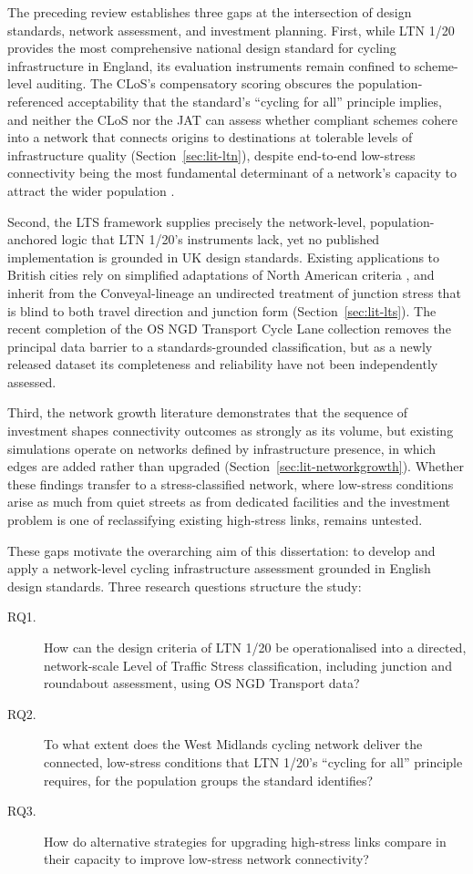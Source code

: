 The preceding review establishes three gaps at the intersection of design standards, network assessment, and investment planning. First, while LTN 1/20 provides the most comprehensive national design standard for cycling infrastructure in England, its evaluation instruments remain confined to scheme-level auditing. The CLoS's compensatory scoring obscures the population-referenced acceptability that the standard's ``cycling for all'' principle implies, and neither the CLoS nor the JAT can assess whether compliant schemes cohere into a network that connects origins to destinations at tolerable levels of infrastructure quality (Section~\ref{sec:lit-ltn}), despite end-to-end low-stress connectivity being the most fundamental determinant of a network's capacity to attract the wider population \parencite{mekuria2012a,lowry2017}.

Second, the LTS framework supplies precisely the network-level, population-anchored logic that LTN 1/20's instruments lack, yet no published implementation is grounded in UK design standards. 
Existing applications to British cities rely on simplified adaptations of North American criteria \parencite{cervero2019,jeong2025}, and inherit from the Conveyal-lineage an undirected treatment of junction stress that is blind to both travel direction and junction form (Section~\ref{sec:lit-lts}). The recent completion of the OS NGD Transport Cycle Lane collection removes the principal data barrier to a standards-grounded classification, but as a newly released dataset its completeness and reliability have not been independently assessed.

Third, the network growth literature demonstrates that the sequence of investment shapes connectivity outcomes as strongly as its volume, but existing simulations operate on networks defined by infrastructure presence, in which edges are added rather than upgraded (Section~\ref{sec:lit-networkgrowth}). Whether these findings transfer to a stress-classified network, where low-stress conditions arise as much from quiet streets as from dedicated facilities and the investment problem is one of reclassifying existing high-stress links, remains untested.

These gaps motivate the overarching aim of this dissertation: to develop and apply a network-level cycling infrastructure assessment grounded in English design standards. Three research questions structure the study:

\begin{description}
  \item[\textnormal{RQ1.}] How can the design criteria of LTN 1/20 be operationalised into a directed, network-scale Level of Traffic Stress classification, including junction and roundabout assessment, using OS NGD Transport data?
  \item[\textnormal{RQ2.}] To what extent does the West Midlands cycling network deliver the connected, low-stress conditions that LTN 1/20's ``cycling for all'' principle requires, for the population groups the standard identifies?
  \item[\textnormal{RQ3.}] How do alternative strategies for upgrading high-stress links compare in their capacity to improve low-stress network connectivity?
\end{description}
